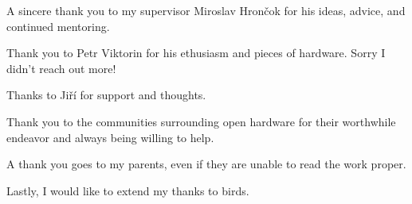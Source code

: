 A sincere thank you to my supervisor Miroslav Hrončok for his ideas, advice, and continued mentoring.

Thank you to Petr Viktorin for his ethusiasm and pieces of hardware.  Sorry I didn't reach out more!

Thanks to Jiří for support and thoughts.

Thank you to the communities surrounding open hardware for their worthwhile endeavor and always being willing to help.

A thank you goes to my parents, even if they are unable to read the work proper.

Lastly, I would like to extend my thanks to birds.

